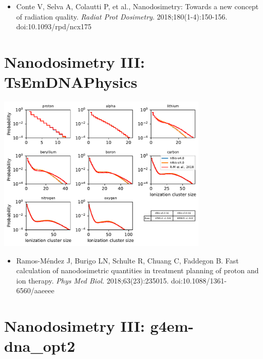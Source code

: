 \documentclass[aspectratio=1610]{beamer}
\begin{document}
\begin{frame}{\secname}
\begin{columns}
\begin{column}{0.4\linewidth}
    \end{column}
   \end{columns}
\begin{itemize}
\item \tiny{Conte V, Selva A, Colautti P, et al., Nanodosimetry: Towards a new concept of radiation quality. \textit{Radiat Prot Dosimetry}. 2018;180(1-4):150-156. doi:10.1093/rpd/ncx175}
\end{itemize}
\end{frame}

\section{Nanodosimetry III: TsEmDNAPhysics}

\begin{frame}{\secname}
 \centering
   \includegraphics[width=0.75\textwidth]{./NanodosimetryIII/nanoIII_TsEMDNAPhysics}
\begin{itemize}
 \item \tiny{Ramos-M\'endez J, Burigo LN, Schulte R, Chuang C, Faddegon B. Fast calculation of nanodosimetric quantities in treatment planning of proton and ion therapy. \textit{Phys Med Biol.} 2018;63(23):235015. doi:10.1088/1361-6560/aaeeee}
\end{itemize}
\end{frame}

\section{Nanodosimetry III: g4em-dna\_opt2}
\end{document}
